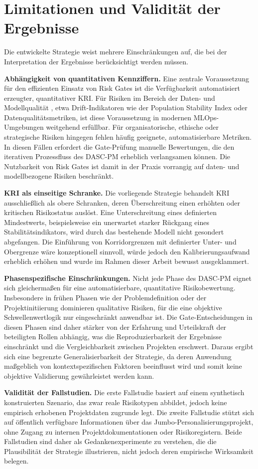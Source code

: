\section{Limitationen und Validität der Ergebnisse}

Die entwickelte Strategie weist mehrere Einschränkungen auf, die bei der 
Interpretation der Ergebnisse berücksichtigt werden müssen.

\textbf{Abhängigkeit von quantitativen Kennziffern.} Eine zentrale Voraussetzung 
für den effizienten Einsatz von Risk Gates ist die Verfügbarkeit automatisiert 
erzeugter, quantitativer KRI. Für Risiken im Bereich der Daten- und Modellqualität 
, etwa Drift-Indikatoren wie der Population Stability Index oder 
Datenqualitätsmetriken, ist diese Voraussetzung in modernen MLOps-Umgebungen 
weitgehend erfüllbar. Für organisatorische, ethische oder strategische Risiken 
hingegen fehlen häufig geeignete, automatisierbare Metriken. In diesen Fällen 
erfordert die Gate-Prüfung manuelle Bewertungen, die den iterativen Prozessfluss 
des DASC-PM erheblich verlangsamen können. Die Nutzbarkeit von Risk Gates ist 
damit in der Praxis vorrangig auf daten- und modellbezogene Risiken beschränkt.

\textbf{KRI als einseitige Schranke.} Die vorliegende Strategie behandelt KRI 
ausschließlich als obere Schranken, deren Überschreitung einen erhöhten oder 
kritischen Risikostatus auslöst. Eine Unterschreitung eines definierten 
Mindestwerts, beispielsweise ein unerwartet starker Rückgang eines 
Stabilitätsindikators, wird durch das bestehende Modell nicht gesondert 
abgefangen. Die Einführung von Korridorgrenzen mit definierter Unter- und 
Obergrenze wäre konzeptionell sinnvoll, würde jedoch den Kalibrierungsaufwand 
erheblich erhöhen und wurde im Rahmen dieser Arbeit bewusst ausgeklammert.

\textbf{Phasenspezifische Einschränkungen.} Nicht jede Phase des DASC-PM eignet 
sich gleichermaßen für eine automatisierbare, quantitative Risikobewertung. 
Insbesondere in frühen Phasen wie der Problemdefinition oder der Projektinitiierung 
dominieren qualitative Risiken, für die eine objektive Schwellenwertlogik nur 
eingeschränkt anwendbar ist. Die Gate-Entscheidungen in diesen Phasen sind daher 
stärker von der Erfahrung und Urteilskraft der beteiligten Rollen abhängig, was 
die Reproduzierbarkeit der Ergebnisse einschränkt und die Vergleichbarkeit zwischen Projekten erschwert.
Daraus ergibt sich eine begrenzte Generalisierbarkeit der Strategie, da deren Anwendung maßgeblich von 
kontextspezifischen Faktoren beeinflusst wird und somit keine objektive Validierung gewährleistet werden kann.

\textbf{Validität der Fallstudien.} Die erste Fallstudie basiert auf einem 
synthetisch konstruierten Szenario, das zwar reale Risikotypen abbildet, jedoch 
keine empirisch erhobenen Projektdaten zugrunde legt. Die zweite Fallstudie stützt 
sich auf öffentlich verfügbare Informationen über das Jumbo-Personalisierungsprojekt, 
ohne Zugang zu internen Projektdokumentationen oder Risikoregistern. Beide Fallstudien 
sind daher als Gedankenexperimente zu verstehen, die die Plausibilität der Strategie 
illustrieren, nicht jedoch deren empirische Wirksamkeit belegen.